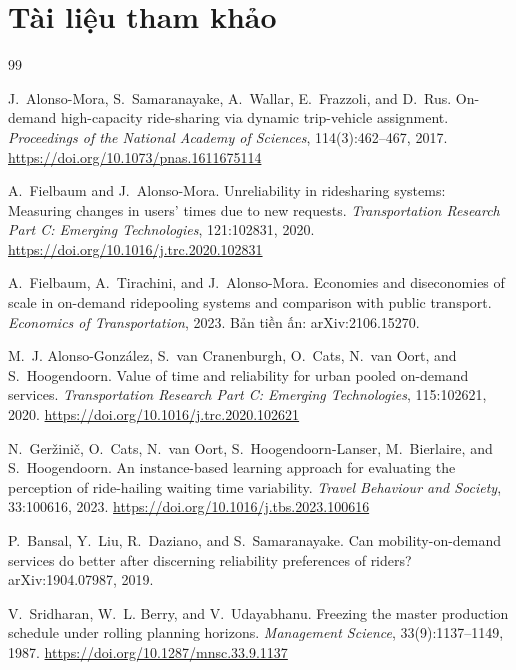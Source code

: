 \chapter*{Tài liệu tham khảo}

\begin{thebibliography}{99}
\setlength{\itemsep}{5pt}

J.~Alonso-Mora, S.~Samaranayake, A.~Wallar, E.~Frazzoli, and D.~Rus.
\newblock On-demand high-capacity ride-sharing via dynamic trip-vehicle assignment.
\newblock \emph{Proceedings of the National Academy of Sciences}, 114(3):462--467, 2017.
\newblock \url{https://doi.org/10.1073/pnas.1611675114}

A.~Fielbaum and J.~Alonso-Mora.
\newblock Unreliability in ridesharing systems: Measuring changes in users' times due to new
requests.
\newblock \emph{Transportation Research Part C: Emerging Technologies}, 121:102831, 2020.
\newblock \url{https://doi.org/10.1016/j.trc.2020.102831}

A.~Fielbaum, A.~Tirachini, and J.~Alonso-Mora.
\newblock Economies and diseconomies of scale in on-demand ridepooling systems and comparison
with public transport.
\newblock \emph{Economics of Transportation}, 2023. Bản tiền ấn: arXiv:2106.15270.

M.~J. Alonso-González, S.~van Cranenburgh, O.~Cats, N.~van Oort, and S.~Hoogendoorn.
\newblock Value of time and reliability for urban pooled on-demand services.
\newblock \emph{Transportation Research Part C: Emerging Technologies}, 115:102621, 2020.
\newblock \url{https://doi.org/10.1016/j.trc.2020.102621}

N.~Geržinič, O.~Cats, N.~van Oort, S.~Hoogendoorn-Lanser, M.~Bierlaire, and S.~Hoogendoorn.
\newblock An instance-based learning approach for evaluating the perception of ride-hailing
waiting time variability.
\newblock \emph{Travel Behaviour and Society}, 33:100616, 2023.
\newblock \url{https://doi.org/10.1016/j.tbs.2023.100616}

P.~Bansal, Y.~Liu, R.~Daziano, and S.~Samaranayake.
\newblock Can mobility-on-demand services do better after discerning reliability preferences of
riders?
\newblock arXiv:1904.07987, 2019.

V.~Sridharan, W.~L. Berry, and V.~Udayabhanu.
\newblock Freezing the master production schedule under rolling planning horizons.
\newblock \emph{Management Science}, 33(9):1137--1149, 1987.
\newblock \url{https://doi.org/10.1287/mnsc.33.9.1137}


\end{thebibliography}
